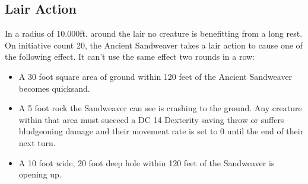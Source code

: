 \documentclass[10pt,openany,twoside,twocolumn]{book}
\begin{document}
\subsection*{Lair Action}
In a radius of 10.000ft. around the lair no creature is benefitting from a long rest.\\
On initiative count 20, the Ancient Sandweaver takes a lair action to cause one of the following effect. It can't use the same effect two rounds in a row:
\begin{itemize}
	\item A 30 foot square area of ground within 120 feet of the Ancient Sandweaver becomes quicksand.
	\item A 5 foot rock the Sandweaver can see is crashing to the ground. Any creature within that area must succeed a DC 14 Dexterity saving throw or suffers  bludgeoning damage and their movement rate is set to 0 until the end of their next turn.
	\item A 10 foot wide, 20 foot deep hole within 120 feet of the Sandweaver is opening up.
\end{itemize}
\end{document}
